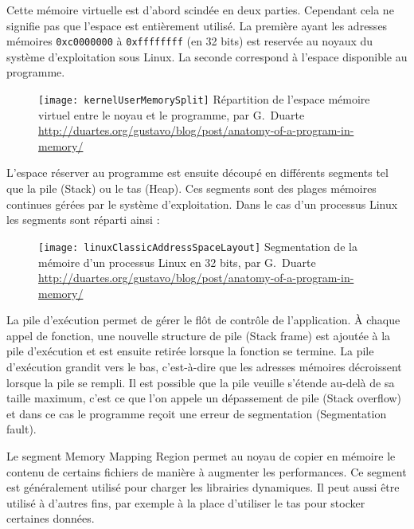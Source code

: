 Cette mémoire virtuelle est d'abord scindée en deux parties. Cependant cela ne signifie pas que l'espace est entièrement utilisé. La première ayant les adresses mémoires \texttt{0xc0000000} à \texttt{0xffffffff} (en 32 bits) est reservée au noyaux du système d'exploitation sous Linux. La seconde correspond à l'espace disponible au programme.

\begin{figure}[H]
	\centering
	\texttt{[image: kernelUserMemorySplit]}
	{Répartition de l'espace mémoire virtuel entre le noyau et le programme, par G.~Duarte}
	{\url{http://duartes.org/gustavo/blog/post/anatomy-of-a-program-in-memory/}}
	\label{fig:kernelUserMemorySplit}
\end{figure}

L'espace réserver au programme est ensuite découpé en différents segments tel que la pile (Stack) ou le tas (Heap). Ces segments sont des plages mémoires continues gérées par le système d'exploitation. Dans le cas d'un processus Linux les segments sont réparti ainsi :

\begin{figure}[H]
	\centering
	\texttt{[image: linuxClassicAddressSpaceLayout]}
	{Segmentation de la mémoire d'un processus Linux en 32 bits, par G.~Duarte}
	{\url{http://duartes.org/gustavo/blog/post/anatomy-of-a-program-in-memory/}}
	\label{fig:linuxClassicAddressSpaceLayout}
\end{figure}

La pile d'exécution permet de gérer le flôt de contrôle de l'application. À chaque appel de fonction, une nouvelle structure de pile (Stack frame) est ajoutée à la pile d'exécution et est ensuite retirée lorsque la fonction se termine. La pile d'exécution grandit vers le bas, c'est-à-dire que les adresses mémoires décroissent lorsque la pile se rempli. Il est possible que la pile veuille s'étende au-delà de sa taille maximum, c'est ce que l'on appele un dépassement de pile (Stack overflow) et dans ce cas le programme reçoit une erreur de segmentation (Segmentation fault).

Le segment \og Memory Mapping Region \fg permet au noyau de copier en mémoire le contenu de certains fichiers de manière à augmenter les performances. Ce segment est généralement utilisé pour charger les librairies dynamiques. Il peut aussi être utilisé à d'autres fins, par exemple à la place d'utiliser le tas pour stocker certaines données.

